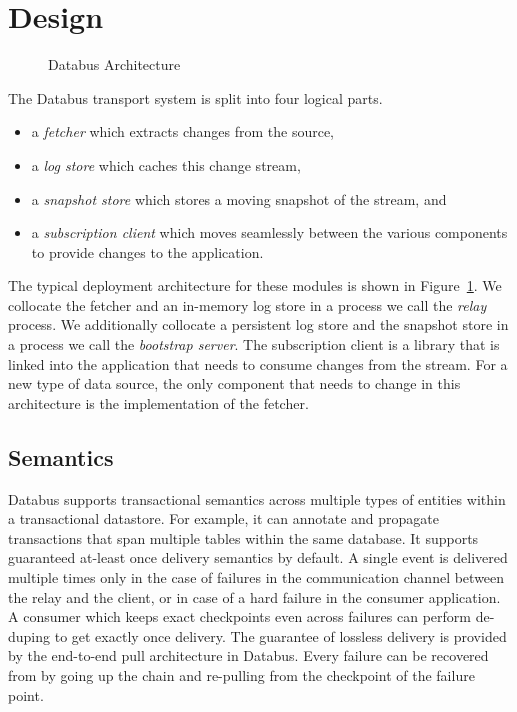 \section{Design}

\begin{figure}
\centering
{}
\caption{Databus Architecture}
\label{fig:databus-architecture}
\end{figure}

The Databus transport system is split into four logical parts. 
\begin{itemize}
\item a \emph{fetcher} which extracts changes from the source, 
\item a \emph{log store} which caches this change stream, 
\item a \emph{snapshot store} which stores a moving snapshot of the stream, and 
\item a \emph{subscription client} which moves seamlessly between the various components to provide changes to the application. 
\end{itemize}

The typical deployment architecture for these modules is shown in Figure~\ref{fig:databus-architecture}. We collocate the fetcher and an in-memory log store in a process we call the \emph{relay} process. We additionally collocate a persistent log store and the snapshot store in a process we call the \emph{bootstrap server}. The subscription client is a library that is linked into the application that needs to consume changes from the stream. For a new type of data source, the only component that needs to change in this architecture is the implementation of the fetcher. 
 
\subsection{Semantics}
Databus supports transactional semantics across multiple types of entities within a transactional datastore. For example, it can annotate and propagate transactions that span multiple tables within the same database. It supports guaranteed at-least once delivery semantics by default. A single event is delivered multiple times only in the case of failures in the communication channel between the relay and the client, or in case of a hard failure in the consumer application. A consumer which keeps exact checkpoints even across failures can perform de-duping to get exactly once delivery. The guarantee of lossless delivery is provided by the end-to-end pull architecture in Databus. Every failure can be recovered from by going up the chain and re-pulling from the checkpoint of the failure point. 







